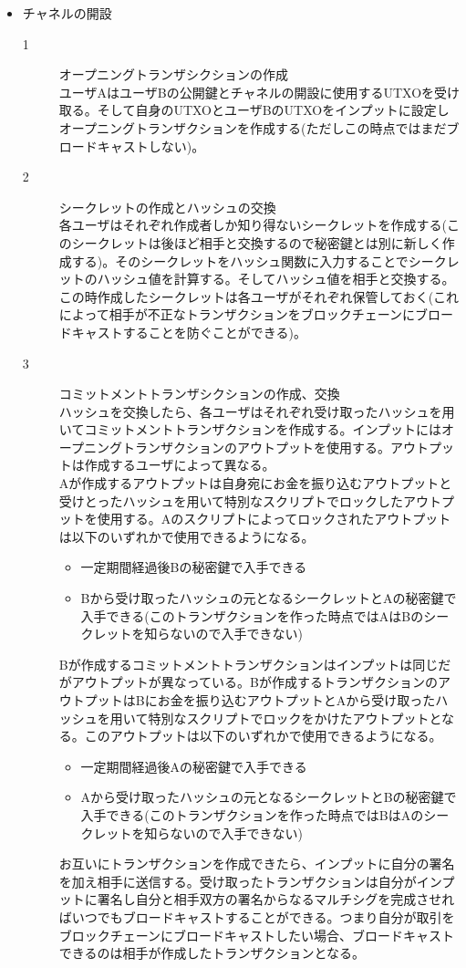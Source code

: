 \documentclass[12pt]{jarticle}
\begin{document}
\begin{itemize}
\item チャネルの開設
\begin{description}
\item[1] オープニングトランザシクションの作成\\
ユーザAはユーザBの公開鍵とチャネルの開設に使用するUTXOを受け取る。そして自身のUTXOとユーザBのUTXOをインプットに設定しオープニングトランザクションを作成する(ただしこの時点ではまだブロードキャストしない)。
\item[2] シークレットの作成とハッシュの交換\\
各ユーザはそれぞれ作成者しか知り得ないシークレットを作成する(このシークレットは後ほど相手と交換するので秘密鍵とは別に新しく作成する)。そのシークレットをハッシュ関数に入力することでシークレットのハッシュ値を計算する。そしてハッシュ値を相手と交換する。この時作成したシークレットは各ユーザがそれぞれ保管しておく(これによって相手が不正なトランザクションをブロックチェーンにブロードキャストすることを防ぐことができる)。
\item[3] コミットメントトランザシクションの作成、交換\\
ハッシュを交換したら、各ユーザはそれぞれ受け取ったハッシュを用いてコミットメントトランザクションを作成する。インプットにはオープニングトランザクションのアウトプットを使用する。アウトプットは作成するユーザによって異なる。\\
Aが作成するアウトプットは自身宛にお金を振り込むアウトプットと受けとったハッシュを用いて特別なスクリプトでロックしたアウトプットを使用する。Aのスクリプトによってロックされたアウトプットは以下のいずれかで使用できるようになる。
\begin{itemize}
\item 一定期間経過後Bの秘密鍵で入手できる
\item Bから受け取ったハッシュの元となるシークレットとAの秘密鍵で入手できる(このトランザクションを作った時点ではAはBのシークレットを知らないので入手できない)
\end{itemize}
Bが作成するコミットメントトランザクションはインプットは同じだがアウトプットが異なっている。Bが作成するトランザクションのアウトプットはBにお金を振り込むアウトプットとAから受け取ったハッシュを用いて特別なスクリプトでロックをかけたアウトプットとなる。このアウトプットは以下のいずれかで使用できるようになる。
\begin{itemize}
\item 一定期間経過後Aの秘密鍵で入手できる
\item Aから受け取ったハッシュの元となるシークレットとBの秘密鍵で入手できる(このトランザクションを作った時点ではBはAのシークレットを知らないので入手できない)
\end{itemize}
お互いにトランザクションを作成できたら、インプットに自分の署名を加え相手に送信する。受け取ったトランザクションは自分がインプットに署名し自分と相手双方の署名からなるマルチシグを完成させればいつでもブロードキャストすることができる。つまり自分が取引をブロックチェーンにブロードキャストしたい場合、ブロードキャストできるのは相手が作成したトランザクションとなる。


\end{description}
\end{itemize}
\end{document}
